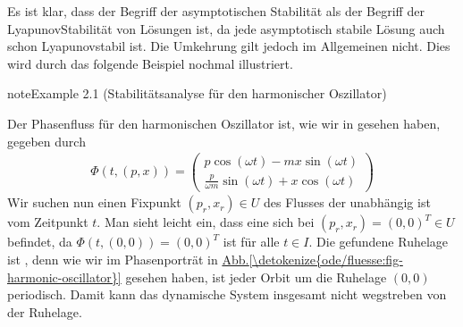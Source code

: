 \documentclass[letterpaper,10pt,german]{jupyterBook}
\begin{document}
\sphinxAtStartPar
Es ist klar, dass der Begriff der asymptotischen Stabilität  als der Begriff der Lyapunov\sphinxhyphen{}Stabilität von Lösungen ist, da jede asymptotisch stabile Lösung auch schon Lyapunov\sphinxhyphen{}stabil ist.
Die Umkehrung gilt jedoch im Allgemeinen nicht.
Dies wird durch das folgende Beispiel nochmal illustriert.
\label{odestability/stabilitaetsbegriffe:example-1}
\begin{sphinxadmonition}{note}{Example 2.1 (Stabilitätsanalyse für den harmonischer Oszillator)}



\sphinxAtStartPar
Der Phasenfluss für den harmonischen Oszillator ist, wie wir in {\hyperref[\detokenize{ode/fluesse:ex:oscillations}]{}} gesehen haben, gegeben durch
\begin{equation*}
\begin{split}\Phi(t, (p,x)) = \begin{pmatrix}
p \cos(\omega t) - m x \sin(\omega t)\\
\frac{p}{\omega m}\sin(\omega t) + x\cos(\omega t)
\end{pmatrix}\end{split}
\end{equation*}
\sphinxAtStartPar
Wir suchen nun einen Fixpunkt \((p_r,x_r) \in U\) des Flusses der unabhängig ist vom Zeitpunkt \(t\).
Man sieht leicht ein, dass eine  sich bei \((p_r,x_r) = (0,0)^T \in U\) befindet, da \(\Phi(t,(0,0)) = (0,0)^T\) ist für alle \(t \in I\).
Die gefundene Ruhelage ist , denn wie wir im Phasenporträt in \hyperref[\detokenize{ode/fluesse:fig-harmonic-oscillator}]{Abb.\@ \ref{\detokenize{ode/fluesse:fig-harmonic-oscillator}}} gesehen haben, ist jeder Orbit um die Ruhelage \((0,0)\) periodisch. Damit kann das dynamische System insgesamt nicht wegstreben von der Ruhelage.


\end{sphinxadmonition}
\end{document}
